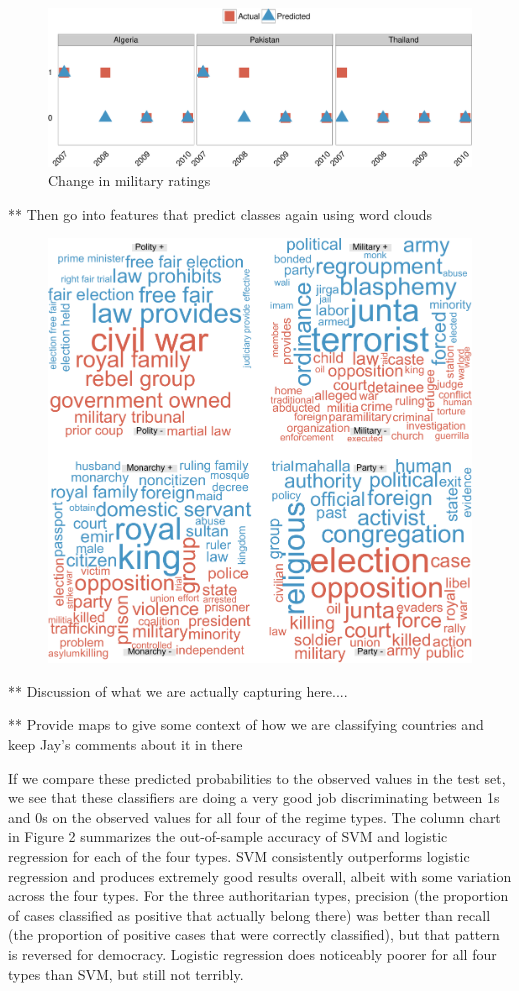 \documentclass[pdftex,12pt,fullpage,oneside]{amsart}
\begin{document}

\begin{figure}[ht]
	\centering
	\includegraphics[width=.8\textwidth]{military_perfChange}
	\caption{Change in military ratings}
\end{figure}

** Then go into features that predict classes again using word clouds

\begin{figure}[ht]
	\centering
	\includegraphics[width=.7\textwidth]{pol_bin_wrdCloud}
\end{figure}
\FloatBarrier

** Discussion of what we are actually capturing here....

** Provide maps to give some context of how we are classifying countries and keep Jay's comments about it in there

If we compare these predicted probabilities to the observed values in the test set, we see that these classifiers are doing a very good job discriminating between 1s and 0s on the observed values for all four of the regime types. The column chart in Figure 2 summarizes the out-of-sample accuracy of SVM and logistic regression for each of the four types. SVM consistently outperforms logistic regression and produces extremely good results overall, albeit with some variation across the four types. For the three authoritarian types, precision (the proportion of cases classified as positive that actually belong there) was better than recall (the proportion of positive cases that were correctly classified), but that pattern is reversed for democracy. Logistic regression does noticeably poorer for all four types than SVM, but still not terribly.
\end{document}
